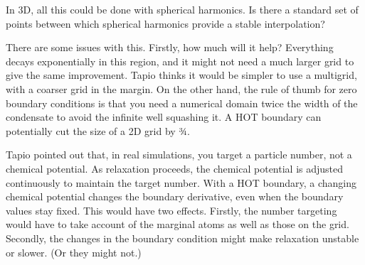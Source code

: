 In 3D, all this could be done with spherical harmonics.  Is there a standard set of points between which spherical harmonics provide a stable interpolation?

There are some issues with this.  Firstly, how much will it help?  Everything decays exponentially in this region, and it might not need a much larger grid to give the same improvement.  Tapio thinks it would be simpler to use a multigrid, with a coarser grid in the margin.  On the other hand, the rule of thumb for zero boundary conditions is that you need a numerical domain twice the width of the condensate to avoid the infinite well squashing it.  A HOT boundary can potentially cut the size of a 2D grid by ¾.

Tapio pointed out that, in real simulations, you target a particle number, not a chemical potential.  As relaxation proceeds, the chemical potential is adjusted continuously to maintain the target number.  With a HOT boundary, a changing chemical potential changes the boundary derivative, even when the boundary values stay fixed.  This would have two effects.  Firstly, the number targeting would have to take account of the marginal atoms as well as those on the grid.  Secondly, the changes in the boundary condition might make relaxation unstable or slower.  (Or they might not.)

\bye